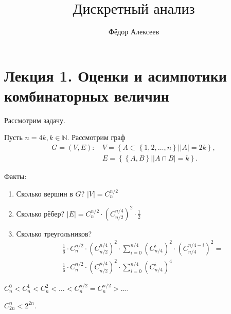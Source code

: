 



\title{$\mbox{Дискретный анализ}$}

\author{Фёдор Алексеев}


\maketitle\gitlink\tableofcontents\newpage{}

\part{Лекция 1. Оценки и асимпотики комбинаторных величин}

\begin{example} Рассмотрим задачу.

  Пусть $n = 4k, k \in \mathbb{N}$. Рассмотрим граф 
  \begin{align*}
	G = (V,E)\mbox{: } &V = \left\{A \subset \left\{1, 2, \ldots, n\right\}| |A| = 2k\right\}, \\
	&E = \left\{ \left\{ A,B \right\}| |A \cap B| = k \right\}.
  \end{align*}

  Факты:
  \begin{enumerate}
	\item Сколько вершин в $G$? $|V| = C_n^{n/2}$
	\item Сколько рёбер? $|E| = C_n^{n/2} \cdot \left( C_{n/2}^{n/4} \right)^2 \cdot \frac{1}{2}$
	\item Сколько треугольников? 
	  \begin{align*}
		&\frac{1}{6} \cdot C_n^{n/2} \cdot \left( C_{n/2}^{n/4} \right)^2 \cdot 
		\sum_{i=0}^{n/4}\left( C_{n/4}^{i} \right)^2 \cdot \left( C_{n/4}^{n/4-i} \right)^2 = \\
		&\frac{1}{6} \cdot C_n^{n/2} \cdot \left( C_{n/2}^{n/4} \right)^2 \cdot \sum_{i=0}^{n/4}\left( C_{n/4}^{i} \right)^4
	  \end{align*}
  \end{enumerate}
\end{example}

\begin{claim}
  \(
	C_{n}^{0} < C_{n}^{1} < C_{n}^{2} < \ldots < C_{n}^{n/2} = C_{n}^{n/2} > \ldots
  \).
\end{claim}

\begin{claim}
  $C_{2n}^{n} < 2^{2n}$.
\end{claim}

